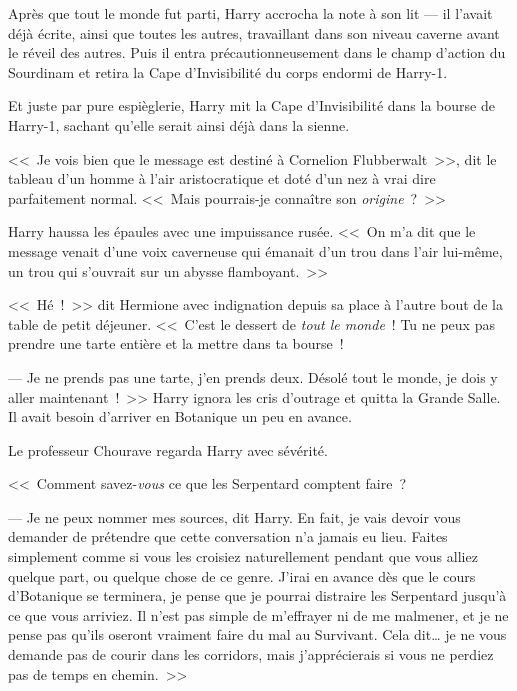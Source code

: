 Après que tout le monde fut parti, Harry accrocha la note à son lit — il l'avait déjà écrite, ainsi que toutes les autres, travaillant dans son niveau caverne avant le réveil des autres. Puis il entra précautionneusement dans le champ d'action du Sourdinam et retira la Cape d'Invisibilité du corps endormi de Harry-1.

Et juste par pure espièglerie, Harry mit la Cape d'Invisibilité dans la bourse de Harry-1, sachant qu'elle serait ainsi déjà dans la sienne.

\later

<<~Je vois bien que le message est destiné à Cornelion Flubberwalt~>>, dit le tableau d'un homme à l'air aristocratique et doté d'un nez à vrai dire parfaitement normal. <<~Mais pourrais-je connaître son \emph{origine}~?~>>

Harry haussa les épaules avec une impuissance rusée. <<~On m'a dit que le message venait d'une voix caverneuse qui émanait d'un trou dans l'air lui-même, un trou qui s'ouvrait sur un abysse flamboyant.~>>

\later

<<~Hé~!~>> dit Hermione avec indignation depuis sa place à l'autre bout de la table de petit déjeuner. <<~C'est le dessert de \emph{tout le monde}~! Tu ne peux pas prendre une tarte entière et la mettre dans ta bourse~!

--- Je ne prends pas une tarte, j'en prends deux. Désolé tout le monde, je dois y aller maintenant~!~>> Harry ignora les cris d'outrage et quitta la Grande Salle. Il avait besoin d'arriver en Botanique un peu en avance.

\later

Le professeur Chourave regarda Harry avec sévérité.

<<~Comment savez-\emph{vous} ce que les Serpentard comptent faire~?

--- Je ne peux nommer mes sources, dit Harry. En fait, je vais devoir vous demander de prétendre que cette conversation n'a jamais eu lieu. Faites simplement comme si vous les croisiez naturellement pendant que vous alliez quelque part, ou quelque chose de ce genre. J'irai en avance dès que le cours d'Botanique se terminera, je pense que je pourrai distraire les Serpentard jusqu'à ce que vous arriviez. Il n'est pas simple de m'effrayer ni de me malmener, et je ne pense pas qu'ils oseront vraiment faire du mal au Survivant. Cela dit… je ne vous demande pas de courir dans les corridors, mais j'apprécierais si vous ne perdiez pas de temps en chemin.~>>

